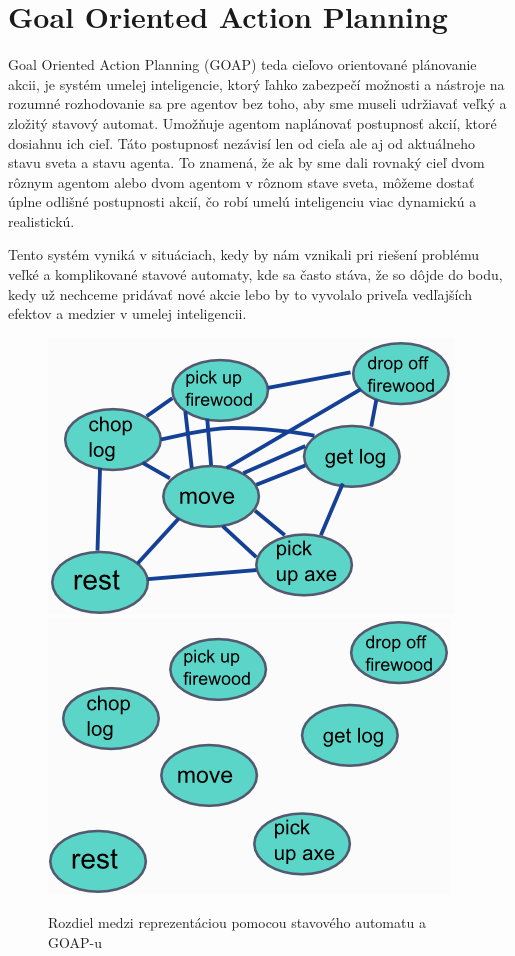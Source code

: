 \section{Goal Oriented Action Planning}
Goal Oriented Action Planning (GOAP) teda cieľovo orientované plánovanie akcii, je systém umelej inteligencie, ktorý ľahko zabezpečí možnosti a nástroje na rozumné rozhodovanie sa pre agentov bez toho, aby sme museli udržiavať veľký a zložitý stavový automat. Umožňuje agentom naplánovať postupnosť akcií, ktoré dosiahnu ich cieľ. Táto postupnosť nezávisí len od cieľa ale aj od aktuálneho stavu sveta a stavu agenta. To znamená, že ak by sme dali rovnaký cieľ dvom rôznym agentom alebo dvom agentom v rôznom stave sveta, môžeme dostať úplne odlišné postupnosti akcií, čo robí umelú inteligenciu viac dynamickú a realistickú.\par
Tento systém vyniká v situáciach, kedy by nám vznikali pri riešení problému veľké a komplikované stavové automaty, kde sa často stáva, že so dôjde do bodu, kedy už nechceme pridávať nové akcie lebo by to vyvolalo priveľa vedľajších efektov a medzier v umelej inteligencii.
\begin{figure}[H] 
\begin{center}
\includegraphics[scale=0.65]{img/fsm_states.png} \hspace{0.5cm}
\includegraphics[scale=0.65]{img/goap_states.png}
\caption{Rozdiel medzi reprezentáciou pomocou stavového automatu a GOAP-u\cite{goap}}
\label{fig:ch22}
\end{center}
\end{figure}
